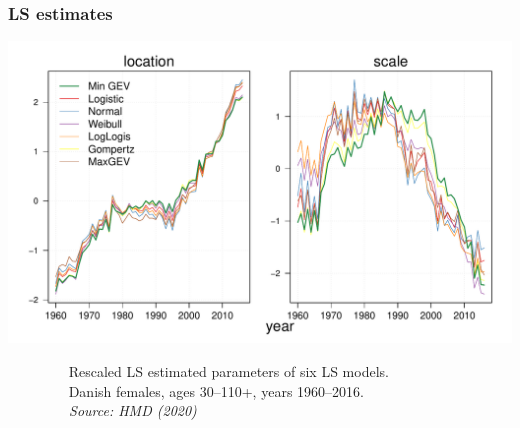 \documentclass[12pt, xcolor=table]{beamer}  %
\begin{document}
\begin{frame}[noframenumbering]
\frametitle{LS estimates}
\vspace{-0.25cm}
\begin{center}
\includegraphics[scale=0.45]{Figures/Ch1/F4_b}
\end{center}
\vspace{-0.3cm}
\tiny{$\quad\quad\quad\quad$ Rescaled LS estimated parameters of six LS models.\\ $\quad\quad\quad\quad$ Danish females, ages 30--110+, years 1960--2016. \\ \emph{$\quad\quad\quad\quad$ Source: HMD (2020)}} %

\end{frame}
\end{document}

